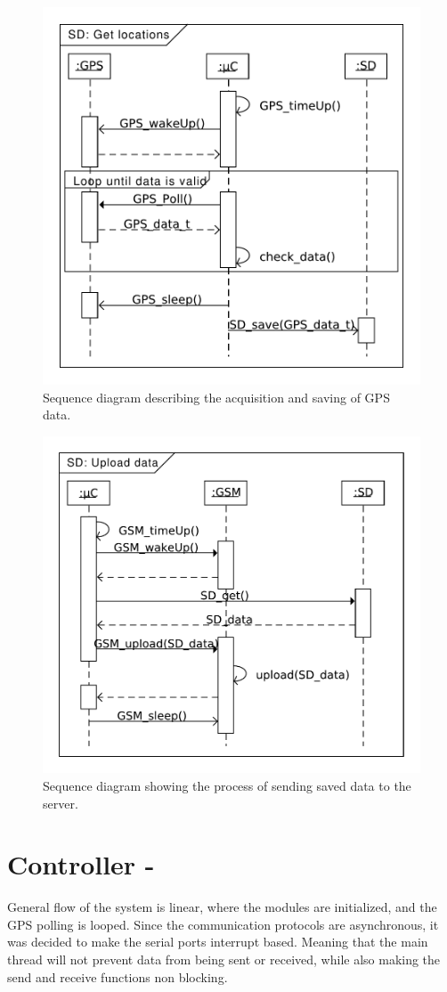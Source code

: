 \begin{figure}
	\centering
	\includegraphics[width=0.7\linewidth]{gfx/Design/SD_getLocation.pdf}
	\caption{Sequence diagram describing the acquisition and saving of GPS data.}
	\label{fig:SD:getlocation}
\end{figure}

\begin{figure}
	\centering
	\includegraphics[width=0.7\linewidth]{gfx/Design/SD_Upload.pdf}
	\caption{Sequence diagram showing the process of sending saved data to the server.}
	\label{fig:SD:upload}
\end{figure}

\FloatBarrier
\section{Controller - \SAMD}
General flow of the system is linear, where the modules are initialized, and the GPS polling is looped. 
Since the communication protocols are asynchronous, it was decided to make the serial ports interrupt based. Meaning that the main thread will not prevent data from being sent or received, while also making the send and receive functions non blocking.

